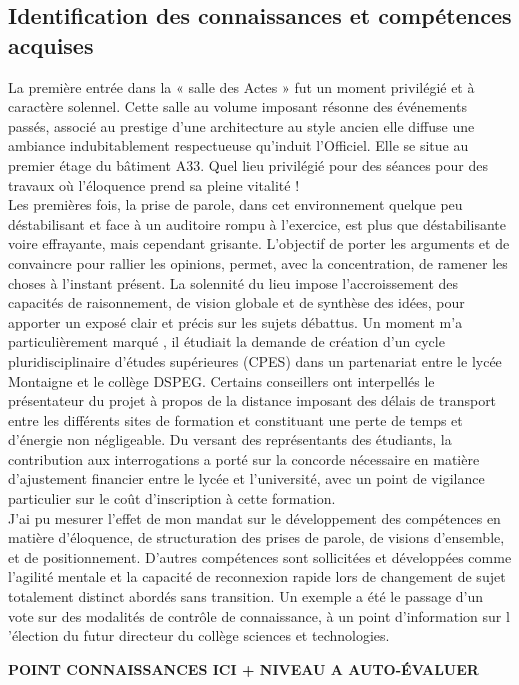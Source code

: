 \documentclass{article}
\begin{document}
\subsection{Identification des connaissances et compétences acquises}
La première entrée dans la « salle des Actes » fut un moment privilégié et à caractère solennel. Cette salle au volume imposant résonne des événements passés, associé au prestige d'une architecture au style ancien elle diffuse une ambiance indubitablement respectueuse qu'induit l'Officiel. Elle se situe au premier étage du bâtiment A33. Quel lieu privilégié pour des séances pour des travaux où l’éloquence prend sa pleine vitalité ! \\ Les premières fois, la prise de parole, dans cet environnement  quelque peu déstabilisant et face à un auditoire rompu à l'exercice, est plus que déstabilisante voire effrayante, mais cependant grisante. L'objectif de porter les arguments et de convaincre pour rallier les opinions, permet, avec la concentration, de ramener les choses à l'instant présent. La solennité du lieu impose l'accroissement des capacités de raisonnement, de vision globale et de synthèse des idées, pour apporter un exposé clair et précis sur les sujets débattus. Un moment m'a particulièrement marqué , il étudiait la demande de création d'un cycle pluridisciplinaire d'études supérieures (CPES) dans un partenariat entre le lycée Montaigne et le collège DSPEG. Certains conseillers ont interpellés le présentateur du projet à propos de la distance imposant des délais de transport entre les différents sites de formation et constituant une perte de temps et d'énergie non négligeable. Du versant des représentants des étudiants, la contribution aux interrogations a porté sur la concorde nécessaire en matière d'ajustement financier entre le lycée et l'université, avec un point de vigilance particulier sur le coût d'inscription à cette formation. \\

J'ai pu mesurer l'effet de mon mandat sur le développement des compétences en matière d'éloquence, de structuration des prises de parole, de visions d'ensemble, et de positionnement. D'autres compétences sont sollicitées et développées comme l'agilité mentale et la capacité de reconnexion rapide lors de changement de sujet totalement distinct abordés sans transition. Un exemple a été le passage d'un vote sur des modalités de contrôle de connaissance, à un point d'information sur l 'élection du futur directeur du collège sciences et technologies. \par
\textbf{POINT CONNAISSANCES ICI + NIVEAU A AUTO-ÉVALUER}
\end{document}
